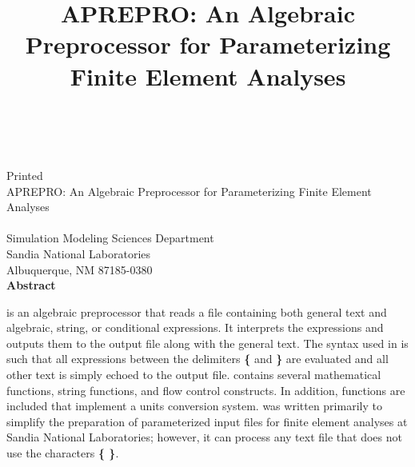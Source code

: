\newif\ifdraft\draftfalse
\newif\ifsand\sandtrue

\SANDprintDate{\today}
\newcommand{\theTitle}{APREPRO: An Algebraic Preprocessor for Parameterizing Finite Element Analyses}
\title{\theTitle}
\ifsand
{}
\doCover
\newpage
\else
\SANDmarks{cover}
\setcounter{page}{3}
\fi


\begin{center}
\SANDnumVar\\
\SANDreleaseTypeVar\\
\ifdraft
Draft Date: \SANDprintDateVar\\
\else
Printed \SANDprintDateVar\\
\fi

\vspace{0.75in}
\theTitle\\
\vspace{0.75in}
\SANDauthorVar\\
Simulation Modeling Sciences Department\\
Sandia National Laboratories\\
Albuquerque, NM 87185-0380\\
\vspace*{.5in}
\textbf{Abstract}
\end{center}
\vspace{-.4cm}\par

\aprepro{} is an algebraic preprocessor that reads a file containing both 
general\textit{ }text and algebraic, string, or conditional expressions. It interprets 
the expressions and outputs them to the output file along with the general text. 
The syntax used in \aprepro{} is such that all expressions between the delimiters 
\textbf{\{} and \textbf{\}} are evaluated and all other text is simply echoed to 
the output file. \aprepro{} contains several mathematical functions,
string functions, and flow control constructs. In addition, functions
are included that implement a units conversion system. \aprepro{} was
written primarily to simplify the preparation of parameterized input
files for finite element analyses at Sandia National Laboratories;
however, it can process any text file that does not use the characters
\textbf{\{ \}}.\newpage

